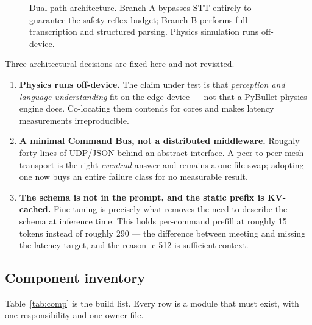 \documentclass[11pt,a4paper]{article}
\newcommand{\code}[1]{{\ttfamily\small #1}}
\begin{document}
\begin{figure}[htbp]
{}
\caption{Dual-path architecture. Branch A bypasses STT entirely to guarantee the safety-reflex budget;
Branch B performs full transcription and structured parsing. Physics simulation runs off-device.}
\label{fig:arch}
\end{figure}

Three architectural decisions are fixed here and not revisited.

\begin{enumerate}[leftmargin=1.6em,itemsep=4pt]
  \item \textbf{Physics runs off-device.} The claim under test is that \emph{perception and language
        understanding} fit on the edge device --- not that a PyBullet physics engine does. Co-locating them
        contends for cores and makes latency measurements irreproducible.
  \item \textbf{A minimal Command Bus, not a distributed middleware.} Roughly forty lines of UDP/JSON
        behind an abstract interface. A peer-to-peer mesh transport is the right \emph{eventual} answer and
        remains a one-file swap; adopting one now buys an entire failure class for no measurable result.
  \item \textbf{The schema is not in the prompt, and the static prefix is KV-cached.} Fine-tuning is
        precisely what removes the need to describe the schema at inference time. This holds per-command
        prefill at roughly 15 tokens instead of roughly 290 --- the difference between meeting and missing
        the latency target, and the reason \code{-c 512} is sufficient context.
\end{enumerate}

\subsection{Component inventory}

Table~\ref{tab:comp} is the build list. Every row is a module that must exist, with one responsibility and
one owner file.
\end{document}
